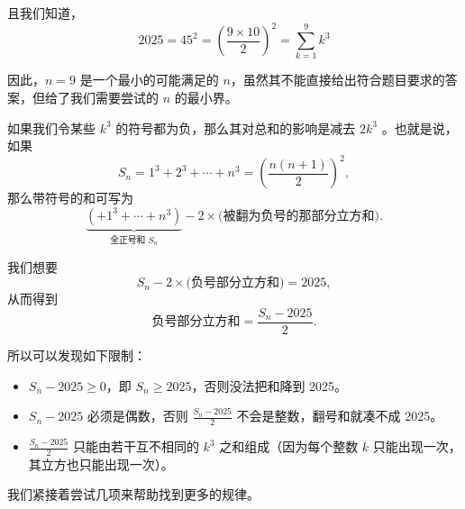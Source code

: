 \documentclass[12pt, a4paper]{article}
\theoremstyle{definition}
\theoremstyle{remark}
\begin{document}
\noindent 且我们知道，
$$
2025 = 45^2 = \left(\frac{9 \times 10}{2}\right)^2 = \sum_{k=1}^9 k^3
$$

\noindent 因此，$n=9$ 是一个最小的可能满足的 $n$，虽然其不能直接给出符合题目要求的答案，但给了我们需要尝试的 $n$ 的最小界。

\noindent 如果我们令某些 $k^3$ 的符号都为负，那么其对总和的影响是减去 $2 k^3$ 。也就是说，如果
$$
S_n=1^3+2^3+\cdots+n^3=\left(\frac{n(n+1)}{2}\right)^2,
$$
那么带符号的和可写为
$$
\underbrace{\left(+1^3+\cdots+n^3\right)}_{\text{全正号和 } S_n} - 2 \times \text{(被翻为负号的那部分立方和)}.
$$

\noindent 我们想要
$$
S_n - 2 \times \text{(负号部分立方和)} = 2025,
$$
从而得到
$$
\text{负号部分立方和} = \frac{S_n - 2025}{2}.
$$

\noindent 所以可以发现如下限制：
\begin{itemize}
    \item $S_n - 2025 \geq 0$，即 $S_n \geq 2025$，否则没法把和降到 2025。
    \item $S_n - 2025$ 必须是偶数，否则 $\frac{S_n - 2025}{2}$ 不会是整数，翻号和就凑不成 2025。
    \item $\frac{S_n - 2025}{2}$ 只能由若干互不相同的 $k^3$ 之和组成（因为每个整数 $k$ 只能出现一次，其立方也只能出现一次）。
\end{itemize}

\noindent 我们紧接着尝试几项来帮助找到更多的规律。
\end{document}
